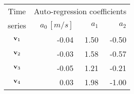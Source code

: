 \begin{tabular}{crrr}
    \toprule
    Time    & \multicolumn{3}{c}{Auto-regression coefficients} \\
    series & $a_0\,[\unit{m/s}]$ & $a_1$ & $a_2$ \\ \otoprule
    $\textbf{v}_{1}$ & -0.04 & 1.50 & -0.50 \\
    $\textbf{v}_{2}$ & -0.03 & 1.58 & -0.57 \\
    $\textbf{v}_{3}$ & -0.05 & 1.21 & -0.21 \\
    $\textbf{v}_{4}$ & 0.03 & 1.98 & -1.00 \\
    \bottomrule
\end{tabular}
